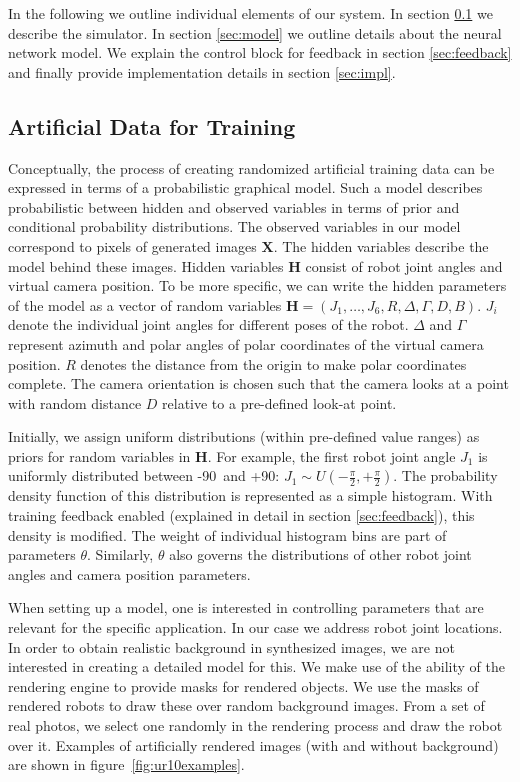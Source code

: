 \documentclass[conference]{IEEEtran}
\begin{document}
    In the following we outline individual elements of our system. In section \ref{sec:artificialData} we describe the simulator. In section \ref{sec:model} we outline details about the neural network model. We explain the control block for feedback in section \ref{sec:feedback} and finally provide implementation details in section \ref{sec:impl}.


\subsection{Artificial Data for Training}
    \label{sec:artificialData}

    Conceptually, the process of creating randomized artificial training data can be expressed in terms of a  probabilistic graphical model. Such a model describes probabilistic between hidden and observed variables in terms of prior and conditional probability distributions. The observed variables in our model correspond to pixels of generated images $\mathbf{X}$. The hidden variables describe the model behind these images. Hidden variables $\mathbf{H}$ consist of robot joint angles and virtual camera position. To be more specific, we can write the hidden parameters of the model as a vector of random variables $\mathbf{H} = (J_1, \dots, J_6, R, \Delta, \Gamma, D, B)$. $J_i$ denote the individual joint angles for different poses of the robot. $\Delta$ and $\Gamma$  represent azimuth and polar angles of polar coordinates of the virtual camera position. $R$ denotes the distance from the origin to make polar coordinates complete. The camera orientation is chosen such that the camera looks at a point with random distance $D$ relative to a pre-defined look-at point. 
    
    Initially, we assign uniform distributions (within pre-defined value ranges) as priors for random variables in $\mathbf{H}$. For example, the first robot joint angle $J_1$ is uniformly distributed between -90\textdegree~and +90\textdegree: $J_1 \sim U(-\frac{\pi}{2},+\frac{\pi}{2})$. The probability density function of this distribution is represented as a simple histogram.  With training feedback enabled (explained in detail in section \ref{sec:feedback}), this density is modified. The weight of individual histogram bins are part of parameters $\theta$. Similarly, $\theta$ also governs the distributions of other robot joint angles and camera position parameters.
    
    When setting up a model, one is interested in controlling parameters that are relevant for the specific application. In our case we address robot joint locations. In order to obtain realistic background in synthesized images, we are not interested in creating a detailed model for this. We make use of the ability of the rendering engine to provide masks for rendered objects. We use the masks of rendered robots to draw these over random background images. From a set of real photos, we select one randomly in the rendering process and draw the robot over it. Examples of artificially rendered images (with and without background) are shown in figure~\ref{fig:ur10examples}.
    
\end{document}
